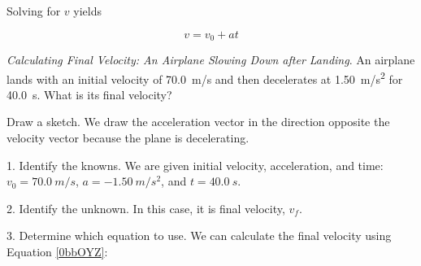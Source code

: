 \documentclass[main-ap-physics.tex]{subfiles}
\begin{document}
Solving for $v$ yields

\begin{equation} \label{0bbOYZ}
    v = v_0 + a t
\end{equation}

\cyanhrule

\vspace{1em}

\begin{example}
    \textit{Calculating Final Velocity: An Airplane Slowing Down after Landing}. An airplane lands with an initial velocity of \SI{70.0}{m/s} and then decelerates at \SI{1.50}{m/s^2} for \SI{40.0}{s}. What is its final velocity?
\end{example}

\Solution Draw a sketch. We draw the acceleration vector in the direction opposite the velocity vector because the plane is decelerating.


\begin{center}
\end{center}

1. Identify the knowns. We are given initial velocity, acceleration, and time: $v_0 = \SI{70.0}{m/s}$, $a = -\SI{1.50}{m/s^2}$, and $t = \SI{40.0}{s}$. 

\vspace{1ex}

2. Identify the unknown. In this case, it is final velocity, $v_f$.

\vspace{1ex}

3. Determine which equation to use. We can calculate the final velocity using Equation \eqref{0bbOYZ}:
\end{document}
